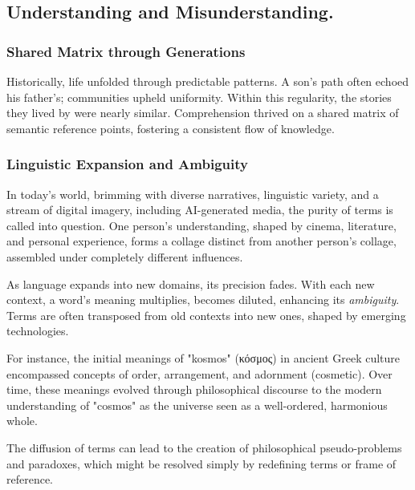 \documentclass[11pt,a4]{article}
\newcommand{\textgreek}[1]{\begingroup\fontencoding{LGR}\selectfont#1\endgroup}
\begin{document}
\newpage
\subsection{Understanding and Misunderstanding.}

    \subsubsection{Shared Matrix through Generations}
        \par
        Historically, life unfolded through predictable patterns. A son's path often echoed his father's;
        communities upheld uniformity. Within this regularity, the stories they lived by were nearly similar.
        Comprehension thrived on a shared matrix of semantic reference points, fostering a consistent flow of knowledge.

    \subsubsection{Linguistic Expansion and Ambiguity}
        \par
        In today's world, brimming with diverse narratives, linguistic variety, and a stream of digital imagery,
        including AI-generated media, the purity of terms is called into question. One person's understanding,
        shaped by cinema, literature, and personal experience, forms a collage distinct from another
        person's collage, assembled under completely different influences.

        \par
        As language expands into new domains, its precision fades. With each new context, a word's meaning
        multiplies, becomes diluted, enhancing its \textit{ambiguity}. Terms are often transposed from old
        contexts into new ones, shaped by emerging technologies.

        For instance,  the initial meanings of "kosmos" (\textgreek{κόσμος}) in ancient Greek culture
        encompassed concepts of order, arrangement, and adornment (cosmetic). Over time, these meanings
        evolved through philosophical discourse to the modern understanding of "cosmos" as the universe
         seen as a well-ordered, harmonious whole.

        \par
        The diffusion of  terms can lead to the creation of philosophical pseudo-problems and paradoxes,
        which might be resolved simply by redefining terms or frame of reference.
        \par
\end{document}

